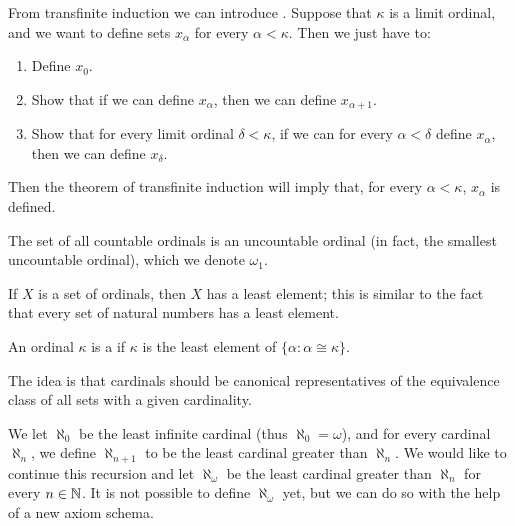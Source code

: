\begin{subsec}
From transfinite induction we can introduce .
Suppose that $\kappa$ is a limit ordinal, and we want to define sets $x_{\alpha}$ for every $\alpha < \kappa$. Then we just have to:
\begin{enumerate}
\item Define $x_{0}$.
\item Show that if we can define $x_{\alpha}$, then we can define $x_{\alpha + 1}$.
\item Show that for every limit ordinal $\delta < \kappa$, if we can for every $\alpha < \delta$ define $x_{\alpha}$, then we can define $x_{\delta}$.
\end{enumerate}
Then the theorem of transfinite induction will imply that, for every $\alpha < \kappa$, $x_{\alpha}$ is defined.
\end{subsec}

\begin{subsec}
The set of all countable ordinals is an uncountable ordinal (in fact, the smallest uncountable ordinal), which we denote $\omega_{1}$.
\end{subsec}

\begin{subsec}
If $X$ is a set of ordinals, then $X$ has a least element; this is similar to the fact that every set of natural numbers has a least element.
\end{subsec}

\begin{definition}\label{cardinalDefinition}
An ordinal $\kappa$ is a  if $\kappa$ is the least element of $\{\alpha: \alpha \cong \kappa\}$.
\end{definition}

\begin{subsec}
The idea is that cardinals should be canonical representatives of the equivalence class of all sets with a given cardinality.
\end{subsec}

\begin{subsec}
We let $\aleph_{0}$ be the least infinite cardinal (thus $\aleph_{0} = \omega$), and for every cardinal $\aleph_{n}$, we define $\aleph_{n+1}$ to be the least cardinal greater than $\aleph_{n}$.
We would like to continue this recursion and let $\aleph_{\omega}$ be the least cardinal greater than $\aleph_{n}$ for every $n \in \mathbb{N}$.
It is not possible to define $\aleph_{\omega}$ yet, but we can do so with the help of a new axiom schema.
\end{subsec}

